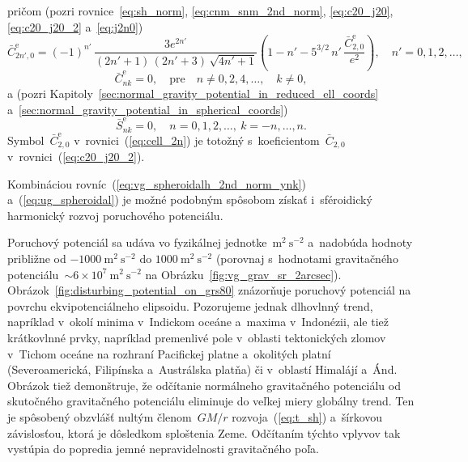 \documentclass[a4paper, 12pt]{book}
\begin{document}
%
pričom (pozri rovnice~\ref{eq:sh_norm}, \ref{eq:cnm_snm_2nd_norm}, 
\ref{eq:c20_j20}, \ref{eq:c20_j20_2} a~\ref{eq:j2n0})
%
\begin{equation}
\label{eq:cell_2n}
\bar{C}^\mathrm{e}_{2n',0} = (-1)^{n'} \, \frac{3e^{2n'}}{(2n' + 1) \, (2n' 
+ 3) \, \sqrt{4n' + 1}} \left( 1 - n' - 5^{3 \slash 2} \, n' \, 
\frac{\bar{C}^\mathrm{e}_{2,0}}{e^2} \right){,} \quad n' = 0, 1, 2,\dots{,}
\end{equation}
%
\begin{equation}
\bar{C}^\mathrm{e}_{nk} = 0{,} \quad \textrm{pre} \quad n \neq 0, 2, 4,\dots, 
\quad k \neq 0{,}
\end{equation}
%
a (pozri Kapitoly~\ref{sec:normal_gravity_potential_in_reduced_ell_coords} 
a~\ref{sec:normal_gravity_potential_in_spherical_coords})
%
\begin{equation}
\bar{S}^\mathrm{e}_{nk} = 0{,} \quad n = 0, 1, 2,\dots, \ k = -n, \dots, n{.}
\end{equation}
%
Symbol~$\bar{C}^\mathrm{e}_{2,0}$ v~rovnici~(\ref{eq:cell_2n}) je totožný 
s~koeficientom~$\bar{C}_{2,0}$ v~rovnici~(\ref{eq:c20_j20_2}).

Kombináciou rovníc~(\ref{eq:vg_spheroidalh_2nd_norm_ynk}) 
a~(\ref{eq:ug_spheroidal}) je možné podobným spôsobom získať i~sféroidický 
harmonický rozvoj poruchového potenciálu.

Poruchový potenciál sa udáva vo fyzikálnej jednotke~$\mathrm{m}^2 
\ \mathrm{s}^{-2}$ a~nadobúda hodnoty približne od $-1000\ \mathrm{m}^2 
\ \mathrm{s}^{-2}$ do $1000 \ \mathrm{m}^2 \ \mathrm{s}^{-2}$ (porovnaj 
s~hodnotami gravitačného potenciálu~${\sim}6 \times 10^7\ \mathrm{m}^2 
\ \mathrm{s}^{-2}$ na Obrázku~\ref{fig:vg_grav_sr_2arcsec}).  
Obrázok~\ref{fig:disturbing_potential_on_grs80} znázorňuje poruchový potenciál 
na povrchu ekvipotenciálneho elipsoidu.  Pozorujeme jednak dlhovlnný trend, 
napríklad v~okolí minima v~Indickom oceáne a~maxima v~Indonézii, ale tiež 
krátkovlnné prvky, napríklad premenlivé pole v~oblasti tektonických zlomov 
v~Tichom oceáne na rozhraní Pacifickej platne a~okolitých platní 
(Severoamerická, Filipínska a~Austrálska platňa) či v~oblastí Himalájí a~Ánd.  
Obrázok tiež demonštruje, že odčítanie normálneho gravitačného potenciálu od 
skutočného gravitačného potenciálu eliminuje do veľkej miery globálny trend.  
Ten je spôsobený obzvlášť nultým členom~$GM \slash r$ rozvoja~(\ref{eq:t_sh}) 
a~šírkovou závislosťou, ktorá je dôsledkom sploštenia Zeme.  Odčítaním týchto 
vplyvov tak vystúpia do popredia jemné nepravidelnosti gravitačného poľa.
\end{document}
